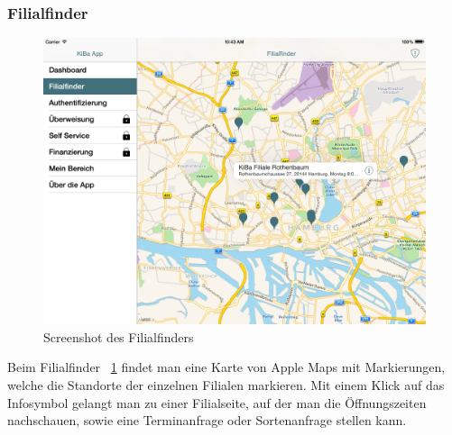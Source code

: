 \subsubsection{Filialfinder}
\begin{figure}[h!]
	\centering
	\includegraphics[height=0.25\textheight]{Pictures/filialfinder}
	\vspace{-12pt}	
	\caption{Screenshot des Filialfinders}
	\label{fig2}
\end{figure}
	Beim Filialfinder ~\ref{fig2} findet man eine Karte von Apple Maps mit Markierungen, welche die Standorte der einzelnen Filialen markieren. Mit einem Klick auf das Infosymbol gelangt man zu einer Filialseite, auf der man die Öffnungszeiten nachschauen, sowie eine Terminanfrage oder Sortenanfrage stellen kann.

